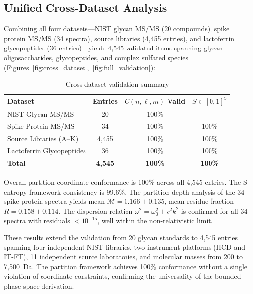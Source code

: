 \documentclass[twocolumn,10pt,a4paper]{article}
\theoremstyle{definition}
\theoremstyle{remark}
\newcommand{\Depth}{\mathcal{M}}
\begin{document}
\subsection{Unified Cross-Dataset Analysis}
\label{sec:crossdataset}

Combining all four datasets---NIST glycan MS/MS (20 compounds), spike protein MS/MS (34 spectra), source libraries (4,455 entries), and lactoferrin glycopeptides (36 entries)---yields 4,545 validated items spanning glycan oligosaccharides, glycopeptides, and complex sulfated species (Figures~\ref{fig:cross_dataset},~\ref{fig:full_validation}):

\begin{table}[H]
\centering
\caption{Cross-dataset validation summary}
\label{tab:crossdataset}
\small
\begin{tabular}{lccc}
\toprule
\textbf{Dataset} & \textbf{Entries} & \textbf{$C(n,\ell,m)$ Valid} & \textbf{$S \in [0,1]^3$} \\
\midrule
NIST Glycan MS/MS & 20 & 100\% & --- \\
Spike Protein MS/MS & 34 & 100\% & 100\% \\
Source Libraries (A--K) & 4,455 & 100\% & 100\% \\
Lactoferrin Glycopeptides & 36 & 100\% & 100\% \\
\midrule
\textbf{Total} & \textbf{4,545} & \textbf{100\%} & \textbf{100\%} \\
\bottomrule
\end{tabular}
\end{table}

Overall partition coordinate conformance is 100\% across all 4,545 entries. The S-entropy framework consistency is 99.6\%. The partition depth analysis of the 34 spike protein spectra yields mean $\Depth = 0.166 \pm 0.135$, mean residue fraction $R = 0.158 \pm 0.114$. The dispersion relation $\omega^2 = \omega_0^2 + c^2k^2$ is confirmed for all 34 spectra with residuals $< 10^{-15}$, well within the non-relativistic limit.

These results extend the validation from 20 glycan standards to 4,545 entries spanning four independent NIST libraries, two instrument platforms (HCD and IT-FT), 11 independent source laboratories, and molecular masses from 200 to 7,500~Da. The partition framework achieves 100\% conformance without a single violation of coordinate constraints, confirming the universality of the bounded phase space derivation.
\end{document}
